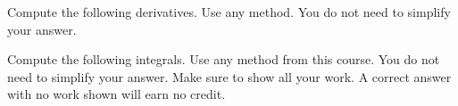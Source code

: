 \documentclass[addpoints,12pt]{exam}
\begin{document}
\begin{questions}
\begin{parts}
\vfill
\vfill

\end{parts}

\newpage




\question Compute the following derivatives. Use any method. You do not need to simplify your
answer.





\newpage

\question Compute the following integrals. Use any method from this course. You do not need to
simplify your answer. Make sure to show all your work. A correct answer with no work shown
will earn no credit.

\end{questions}
\end{document}
